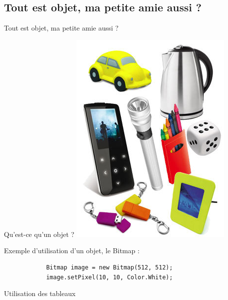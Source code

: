 \documentclass{beamer}
\begin{document}
\subsection{Tout est objet,  ma petite amie aussi ?}
\begin{frame}[fragile]
    \begin{center}
        \huge{Tout est objet, ma petite amie aussi ?}
    \end{center}
\end{frame}

\begin{frame}[fragile]
    \begin{center}
        Qu'est-ce qu'un objet ?\newline\newline
        \includegraphics[scale=0.4]{images/objet.jpg}
    \end{center}
\end{frame}

\begin{frame}[fragile]
Exemple d'utilisation d'un objet, le Bitmap :
	\begin{center}
		\begin{lstlisting}
			Bitmap image = new Bitmap(512, 512);
			image.setPixel(10, 10, Color.White);
		\end{lstlisting}
	\end{center}
\end{frame}


\begin{frame}[fragile]
Utilisation des tableaux
	
\end{frame}
\end{document}

